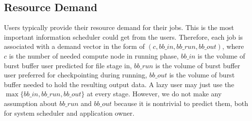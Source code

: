 \subsection{Resource Demand}
Users typically provide their resource demand for their jobs.
This is the most important information scheduler could get from the users.
Therefore, each job is associated with a demand vector in the form of $(c, bb\_in, bb\_run, bb\_out)$,
where $c$ is the number of needed compute node in running phase,
$bb\_in$ is the volume of burst buffer user predicted for file stage in,
$bb\_run$ is the volume of burst buffer user preferred for checkpointing during running,
$bb\_out$ is the volume of burst buffer needed to hold the resulting output data.
A lazy user may just use the $\max\{bb\_in, bb\_run, bb\_out\}$ at every stage.
However, we do not make any assumption about $bb\_run$ and $bb\_out$ because it is nontrivial to predict them,
both for system scheduler and application owner.

